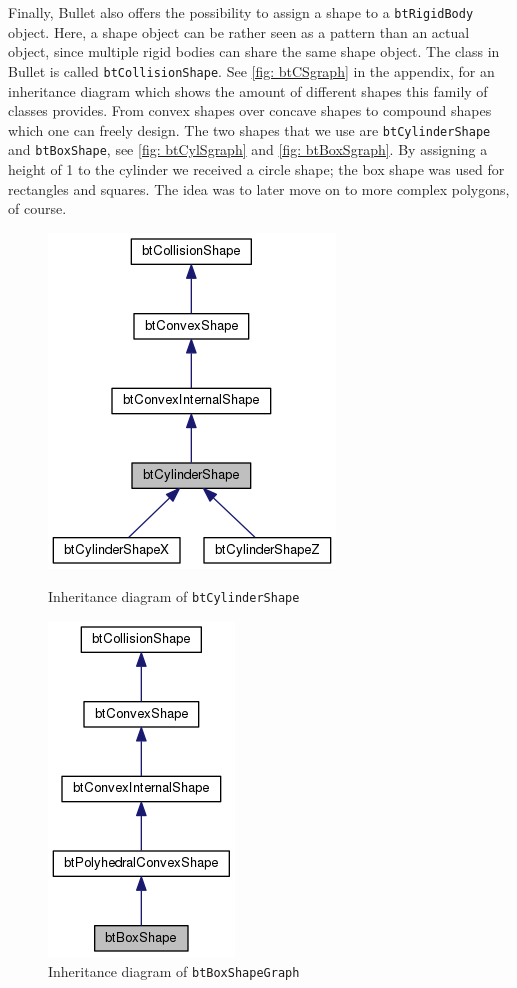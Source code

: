 Finally, Bullet also offers the possibility to assign a shape to a \texttt{btRigidBody} object. Here, a shape object can be rather seen as a pattern than an actual object, since multiple rigid bodies can share the same shape object. The class in Bullet is called \texttt{btCollisionShape}. See \autoref{fig: btCSgraph} in the appendix, for an inheritance diagram which shows the amount of different shapes this family of classes provides. From convex shapes over concave shapes to compound shapes which one can freely design. The two shapes that we use are \texttt{btCylinderShape} and \texttt{btBoxShape}, see \autoref{fig: btCylSgraph} and \autoref{fig: btBoxSgraph}. By assigning a height of 1 to the cylinder we received a circle shape; the box shape was used for rectangles and squares. The idea was to later move on to more complex polygons, of course.
\begin{figure}[ht]
\centering
\begin{minipage}{.45\linewidth}
\centering
\includegraphics[scale=0.5]{img/RigidBodies/btCylinderShapeGraph.png}
\caption{Inheritance diagram of \texttt{btCylinderShape}}
\label{fig: btCylSgraph}
\end{minipage}
\hspace{.05\linewidth}
\begin{minipage}{.45\linewidth}
\centering
\includegraphics[scale=0.5]{img/RigidBodies/btBoxShapeGraph.png}
\caption{Inheritance diagram of \texttt{btBoxShapeGraph}}
\label{fig: btBoxSgraph}
\end{minipage}
\end{figure}

